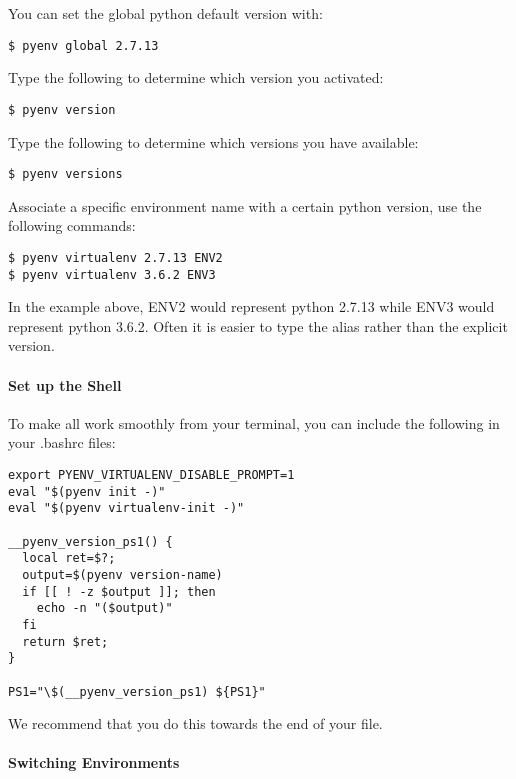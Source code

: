 You can set the global python default version with:

\begin{verbatim}
$ pyenv global 2.7.13
\end{verbatim}

Type the following to determine which version you activated:

\begin{verbatim}
$ pyenv version
\end{verbatim}

Type the following to determine which versions you have available:

\begin{verbatim}
$ pyenv versions
\end{verbatim}

Associate a specific environment name with a certain python version, use
the following commands:

\begin{verbatim}
$ pyenv virtualenv 2.7.13 ENV2
$ pyenv virtualenv 3.6.2 ENV3
\end{verbatim}

In the example above, ENV2 would represent python 2.7.13 while ENV3
would represent python 3.6.2. Often it is easier to type the alias
rather than the explicit version.

\paragraph{Set up the Shell}\label{set-up-the-shell}

To make all work smoothly from your terminal, you can include the
following in your .bashrc files:

\begin{verbatim}
export PYENV_VIRTUALENV_DISABLE_PROMPT=1
eval "$(pyenv init -)"
eval "$(pyenv virtualenv-init -)"

__pyenv_version_ps1() {
  local ret=$?;
  output=$(pyenv version-name)
  if [[ ! -z $output ]]; then
    echo -n "($output)"
  fi
  return $ret;
}

PS1="\$(__pyenv_version_ps1) ${PS1}"
\end{verbatim}

We recommend that you do this towards the end of your file.

\paragraph{Switching Environments}\label{switching-environments}

